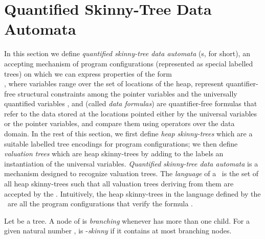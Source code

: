 \documentclass{llncs}
\begin{document}
\section{Quantified Skinny-Tree Data Automata} \label{sec:qda}
In this section we define {\em quantified skinny-tree data automata} (\QSDA s, for short), an accepting  mechanism  of program configurations (represented as special labelled trees) on which we can express properties of the form \\
   ,
where variables  range over the set of locations of the heap,  represent quantifier-free structural constraints among the pointer variables and the universally quantified variables , and  (called {\em data formulas}) are quantifier-free formulas that refer to the data stored at the locations pointed either by the universal variables  or the pointer variables, and compare them using operators over the data domain.  In the rest of this section, we first define {\em heap skinny-trees} which are a suitable labelled tree encodings for program configurations; we then define {\em valuation trees} which are heap skinny-trees by adding to the labels an instantiation of the universal variables. {\em Quantified skinny-tree data automata} is a mechanism designed to recognize valuation trees. The {\em language} of a \QSDA\ is the set of all heap skinny-trees such that all valuation trees deriving from them are accepted by the \QSDA. Intuitively, the heap skinny-trees in the language defined by the \QSDA\ are all the program configurations that verify the formula .


Let  be a tree. A node  of  is {\em branching} whenever  has more than one child. For a given natural number ,   is  -{\em skinny} if it contains at most  branching nodes.
\end{document}
